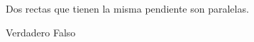 Dos rectas que tienen la misma pendiente son paralelas.

\begin{choices}
    \CorrectChoice Verdadero
    \choice Falso
\end{choices}